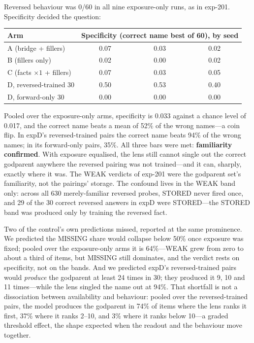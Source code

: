 \documentclass[11pt]{article}
\begin{document}
Reversed behaviour was 0/60 in all nine exposure-only runs, as in
exp-201. Specificity decided the question:

\begin{center}
\begin{tabular}{lccc}
\toprule
Arm & \multicolumn{3}{c}{Specificity (correct name best of 60), by seed} \\
\midrule
A (bridge + fillers) & 0.07 & 0.03 & 0.02 \\
B (fillers only) & 0.02 & 0.00 & 0.02 \\
C (facts $\times 1$ + fillers) & 0.07 & 0.03 & 0.05 \\
D, reversed-trained 30 & 0.50 & 0.53 & 0.40 \\
D, forward-only 30 & 0.00 & 0.00 & 0.00 \\
\bottomrule
\end{tabular}
\end{center}

Pooled over the exposure-only arms, specificity is 0.033 against a
chance level of 0.017, and the correct name beats a mean of 52\% of
the wrong names---a coin flip. In expD's reversed-trained pairs the
correct name beats 94\% of the wrong names; in its forward-only pairs,
35\%. All three bars were met: \textbf{familiarity confirmed}. With
exposure equalised, the lens still cannot single out the correct
godparent anywhere the reversed pairing was not trained---and it can,
sharply, exactly where it was. The WEAK verdicts of exp-201 were the
godparent set's familiarity, not the pairings' storage. The confound
lives in the WEAK band only: across all 630 merely-familiar reversed
probes, STORED never fired once, and 29 of the 30 correct reversed
answers in expD were STORED---the STORED band was produced only by
training the reversed fact.

Two of the control's own predictions missed, reported at the same
prominence. We predicted the MISSING share would collapse below 50\%
once exposure was fixed; pooled over the exposure-only arms it is
64\%---WEAK grew from zero to about a third of items, but MISSING
still dominates, and the verdict rests on specificity, not on the
bands. And we predicted expD's reversed-trained pairs would
\emph{produce} the godparent at least 24 times in 30; they produced
it 9, 10 and 11 times---while the lens singled the name out at 94\%.
That shortfall is not a dissociation between availability and
behaviour: pooled over the reversed-trained pairs, the model produces
the godparent in 74\% of items where the lens ranks it first, 37\%
where it ranks 2--10, and 3\% where it ranks below 10---a graded
threshold effect, the shape expected when the readout and the
behaviour move together.
\end{document}
